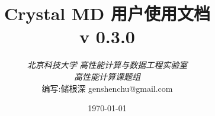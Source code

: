 \begin{titlepage}
    
    \title{ Crystal MD 用户使用文档 \\
            \large v 0.3.0 }
    \author{
    \emph{北京科技大学} \emph{高性能计算与数据工程实验室} \\
    \emph{高性能计算课题组} \\[8cm]
    编写:储根深 genshenchu@gmail.com
    }

    \date{\today}

    \maketitle
\end{titlepage}